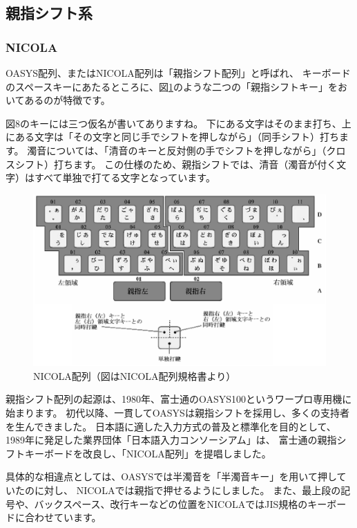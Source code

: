 \subsection{親指シフト系}
\subsubsection*{NICOLA}

OASYS配列、またはNICOLA配列は「親指シフト配列」と呼ばれ、
キーボードのスペースキーにあたるところに、図\ref{fig:nicola}のような二つの「親指シフトキー」をおいてあるのが特徴です。

図8のキーには三つ仮名が書いてありますね。
下にある文字はそのまま打ち、上にある文字は「その文字と同じ手でシフトを押しながら」（同手シフト）打ちます。
濁音については、「清音のキーと反対側の手でシフトを押しながら」（クロスシフト）打ちます。
この仕様のため、親指シフトでは、清音（濁音が付く文字）はすべて単独で打てる文字となっています。

\begin{figure}[htbp]
 \begin{center}
  \includegraphics[width=0.8\hsize]{nicola.eps}
 \end{center}
 \caption{NICOLA配列（図はNICOLA配列規格書より）}
 \label{fig:nicola}
\end{figure}

親指シフト配列の起源は、1980年、富士通のOASYS100というワープロ専用機に始まります。
初代以降、一貫してOASYSは親指シフトを採用し、多くの支持者を生んできました。
日本語に適した入力方式の普及と標準化を目的として、1989年に発足した業界団体「日本語入力コンソーシアム」は、
富士通の親指シフトキーボードを改良し、「NICOLA配列」を提唱しました。

具体的な相違点としては、OASYSでは半濁音を「半濁音キー」を用いて押していたのに対し、
NICOLAでは親指で押せるようにしました。
また、最上段の記号や、バックスペース、改行キーなどの位置をNICOLAではJIS規格のキーボードに合わせています。

